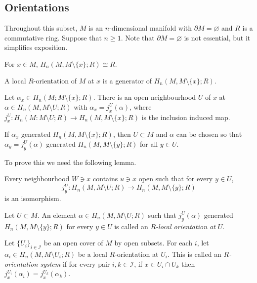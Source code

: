 \subsection{Orientations}

Throughout this subset, $M$ is an $n$-dimensional manifold with $\partial M = \varnothing$ and $R$ is a commutative ring. Suppose that $n \geq 1$. Note that $\partial M = \varnothing$ is not essential, but it simplifies exposition.

\begin{lemma}
    For $x \in M$, $H_n(M, M \setminus \{x\}; R) \cong R$.
\end{lemma}

\begin{definition}
    A local $R$-orientation of $M$ at $x$ is a generator of $H_n(M, M \setminus \{x\}; R)$.
\end{definition}

\begin{lemma}
    Let $\alpha_x \in H_n(M; M \setminus \{x\}; R)$. There is an open neighbourhood $U$ of $x$ at $\alpha \in H_n(M, M \setminus U; R)$ with $\alpha_x = j_x^U(\alpha)$, where $j_x^U: H_n(M: M \setminus U; R) \to H_n(M, M \setminus \{x\}; R)$ is the inclusion induced map.
\end{lemma}

\begin{lemma}
    If $\alpha_x$ generated $H_n(M, M \setminus \{x\}; R)$, then $U \subset M$ and $\alpha$ can be chosen so that $\alpha_y = j_y^U(\alpha)$ generated $H_n(M, M \setminus \{y\}; R)$ for all $y \in U$.
\end{lemma}

To prove this we need the following lemma.

\begin{lemma}
    Every neighbourhood $W \ni x$ contains $u \ni x$ open such that for every $y \in U$,
    \[ j_y^U: H_n(M, M \setminus U; R) \to H_n(M, M \setminus \{y\}; R) \]
    is an isomorphism.
\end{lemma}

\begin{definition}
    Let $U \subset M$. An element $\alpha \in H_n(M, M \setminus U; R)$ such that $j^U_y(\alpha)$ generated $H_n(M, M \setminus \{y\};R)$ for every $y \in U$ is called an \emph{$R$-local orientation at $U$}.
\end{definition}

\begin{definition}
    Let $\{U_i\}_{i \in \mathcal I}$ be an open cover of $M$ by open subsets. For each $i$, let $\alpha_i \in H_n(M, M \setminus U_i; R)$ be a local $R$-orientation at $U_i$. This is called an \emph{$R$-orientation system} if for every pair $i, k \in \mathcal I$, if $x \in U_i \cap U_k$ then $j_x^{U_i}(\alpha_i) = j_x^{U_k}(\alpha_k)$.
\end{definition}

